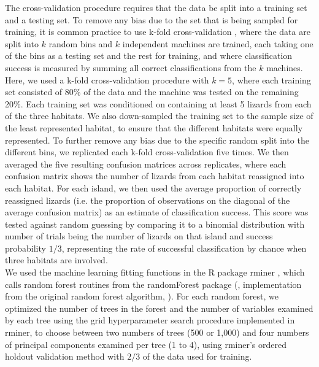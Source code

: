 The cross-validation procedure requires that the data be split into a training set and a testing set. To remove any bias due to the set that is being sampled for training, it is common practice to use k-fold cross-validation \citep{James2013}, where the data are split into $k$ random bins and $k$ independent machines are trained, each taking one of the bins as a testing set and the rest for training, and where classification success is measured by summing all correct classifications from the $k$ machines.\\

Here, we used a k-fold cross-validation procedure with $k = 5$, where each training set consisted of 80\% of the data and the machine was tested on the remaining 20\%. Each training set was conditioned on containing at least 5 lizards from each of the three habitats. We also down-sampled the training set to the sample size of the least represented habitat, to ensure that the different habitats were equally represented. To further remove any bias due to the specific random split into the different bins, we replicated each k-fold cross-validation five times. We then averaged the five resulting confusion matrices across replicates, where each confusion matrix shows the number of lizards from each habitat reassigned into each habitat. For each island, we then used the average proportion of correctly reassigned lizards (i.e. the proportion of observations on the diagonal of the average confusion matrix) as an estimate of classification success. This score was tested against random guessing by comparing it to a binomial distribution with number of trials being the number of lizards on that island and success probability $1/3$, representing the rate of successful classification by chance when three habitats are involved.\\

We used the machine learning fitting functions in the R package rminer \citep{Cortez2020}, which calls random forest routines from the randomForest package (\citealt{Liaw2002}, implementation from the original random forest algorithm, \citealp{Breiman2001}). For each random forest, we optimized the number of trees in the forest and the number of variables examined by each tree using the grid hyperparameter search procedure implemented in rminer, to choose between two numbers of trees (500 or 1,000) and four numbers of principal components examined per tree (1 to 4), using rminer's ordered holdout validation method with $2/3$ of the data used for training.\\

